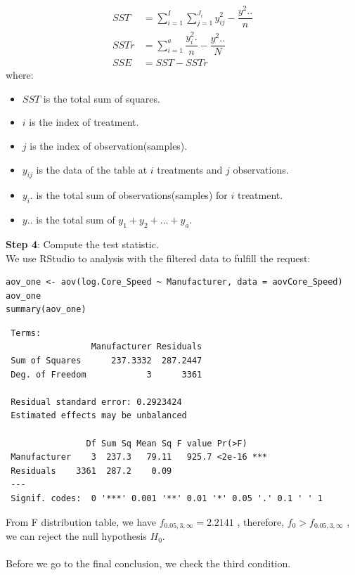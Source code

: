 \documentclass[a4paper]{article}
\begin{document}
\begin{align*}
    SST &= \sum_{i=1}^I \sum_{j=1}^{J_i} y^2_{ij}-\dfrac{y^2..}{n}\\
    SSTr &= \sum_{i=1}^a \dfrac{y^2_i.}{n}-\dfrac{y^2..}{N}\\
    SSE &= SST - SSTr
\end{align*}
where:
\begin{itemize}
    \item $SST$ is the total sum of squares.
    \item $i$ is the index of treatment.
    \item $j$ is the index of observation(samples).
    \item $y_{ij}$ is the data of the table at $i$ treatments and $j$ observations.
    \item $y_i.$ is the total sum of observations(samples) for $i$ treatment.
    \item $y..$ is the total sum of $y_1+y_2+...+y_a$.
\end{itemize}
\bigskip
\textbf{Step 4}: Compute the test statistic.\\
We use RStudio to analysis with the filtered data to fulfill the request:
\begin{mdframed}[leftline=false,rightline=false,backgroundcolor=lightblue!10,nobreak=false]
    \begin{verbatim}
aov_one <- aov(log.Core_Speed ~ Manufacturer, data = aovCore_Speed)
aov_one
summary(aov_one)
    \end{verbatim}
\end{mdframed}
\begin{lstlisting}
 Terms:
                 Manufacturer Residuals
 Sum of Squares      237.3332  287.2447
 Deg. of Freedom            3      3361

 Residual standard error: 0.2923424
 Estimated effects may be unbalanced

                Df Sum Sq Mean Sq F value Pr(>F)    
 Manufacturer    3  237.3   79.11   925.7 <2e-16 ***
 Residuals    3361  287.2    0.09                   
 ---
 Signif. codes:  0 '***' 0.001 '**' 0.01 '*' 0.05 '.' 0.1 ' ' 1
\end{lstlisting}
From F distribution table, we have $f_{0.05, 3, \infty} = 2.2141$ , therefore, $f_0 > f_{0.05,3,\infty}$ , we can reject the null hypothesis $H_0$.\\\\
Before we go to the final conclusion, we check the third condition.\\\\
\end{document}
